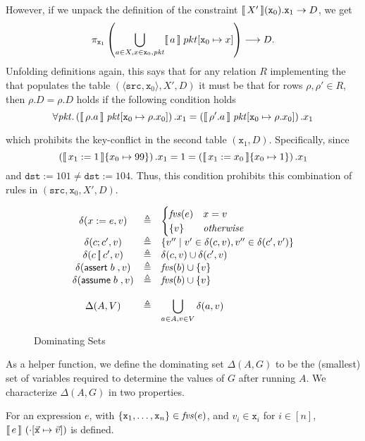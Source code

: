However, if we unpack the definition of the constraint
$\llbracket\,X'\,\rrbracket(\texttt{x}_0).\texttt{x}_1 \to D$, we get
\[\pi_{\texttt{x}_1}\left(\bigcup_{a \in X, x \in
      \texttt{x}_0,\mathit{pkt}} \llbracket\,a\,\rrbracket\; pkt[\texttt{x}_0 \mapsto x]
  \right) \longrightarrow D.\] Unfolding definitions again, this says
that for any relation $R$ implementing the that populates the table
$(\langle\texttt{src},\texttt{x}_0\rangle, X', D)$ it must be that for
rows $\rho, \rho' \in R$, then $\rho.D = \rho.D$ holds if the
following condition holds
\[\forall \mathit{pkt}. \left(\llbracket\,\rho.a\,\rrbracket\; \mathit{pkt}[\texttt{x}_0 \mapsto
    \rho.x_0 ]\right).x_1 =
  \left(\llbracket\,\rho'.a\,\rrbracket\;\mathit{pkt}[\texttt{x}_0\mapsto \rho.x_0
    ]\right).x_1\]

which prohibits the key-conflict in the second table
$(\texttt{x}_1,D)$. Specifically, since
\[\left(\llbracket\,x_1:=1\,\rrbracket \{x_0 \mapsto 99\}\right).x_1 = 1 =
  \left(\llbracket\,x_1:=x_0\,\rrbracket \{x_0 \mapsto 1\}\right).x_1\] and
$\texttt{dst} := 101 \neq \texttt{dst} := 104$. Thus, this condition
prohibits this combination of rules in
$(\texttt{src}, \texttt{x}_0, X', D)$.

\begin{figure}[tpb]
  \[\begin{array}{c>{\triangleq}cl}
      \delta(x := e,v) && \begin{cases}
        \fvs(e) &x = v\\
        \{v\} & \textit{otherwise} \end{cases} \\
      \delta(c;c', v) && \left\{v'' \mid v' \in \delta(c, v), v'' \in \delta(c', v')\right\} \\
      \delta(c\angel c', v) && \delta (c, v) \cup \delta(c', v) \\
      \delta(\assert b, v) && \fvs(b) \cup \{v\} \\
      \delta(\assume b, v) && \fvs(b) \cup \{v\} \\\\
      \Delta(A, V) && \displaystyle\bigcup_{a\in A,v \in V}\delta(a,v)
    \end{array}\]
  \caption{Dominating Sets}
  \label{fig:delta }
\end{figure}

As a helper function, we define the dominating set $\Delta(A,G)$ to be
the (smallest) set of variables required to determine the values of $G$
after running $A$. We characterize $\Delta(A,G)$ in two properties.

\begin{lemma}
  \label{lem:def-fvs-expr}
  For an expression $e$, with
  $\{\texttt{x}_1, \ldots, \texttt{x}_n\} \in \mathit{fvs}(e)$, and
  $v_i \in \texttt{x}_i$ for $i \in [n]$,
  $\llbracket\,e\,\rrbracket~(\cdot[\vec{\texttt{x}} \mapsto \vec{v}])$ is defined.
\end{lemma}

